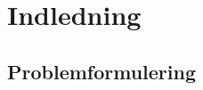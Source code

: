 \chapter{Indledning}\label{ch:indledning}


\section{Problemformulering}\label{sec:problemformulering}

















